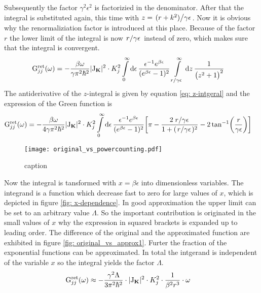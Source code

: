 Subsequently the factor $\gamma^{2} \epsilon^{2}$ is factorizied in the denominator.
After that the integral is substituted again, this time with $z = \flatfrac{(r + k^{2})}{\gamma\epsilon}$.
Now it is obvious why the renormaliziation factor is introduced at this place.
Because of the factor $r$ the lower limit of the integral is now $\flatfrac{r}{\gamma\epsilon}$ instead of zero, which makes sure that the integral is convergent.
%
\begin{align}
	\mt{G}_{jj}^{\mt{ret}}(\omega) &= 
		-\frac{\beta \omega}{\gamma \pi^{2} \hbar^{2}} 
		\vert \mt{J}_{\vb{K}} \vert^{2} \cdot K_{j}^{2}
		\int\limits_{0}^{\infty} \dd{\epsilon}
		\frac{\epsilon^{-1} e^{\beta \epsilon}}{(e^{\beta \epsilon} - 1)^{2}}
		\int\limits_{\flatfrac{r}{\gamma \epsilon}}^{\infty} \dd{z}
		\frac{1}{\big(z^{2} + 1\big)^{2}}
\end{align}
%
The antiderivative of the $z$-integral is given by equation \eqref{eq: z-intgeral} and the expression of the Green function is
%
\begin{align}
	\mt{G}_{jj}^{\mt{ret}}(\omega) &= 
		-\frac{\beta \omega}{4 \gamma \pi^{2} \hbar^{2}}
		\vert \mt{J}_{\vb{K}} \vert^{2} \cdot K_{j}^{2}
		\int\limits_{0}^{\infty} \dd{\epsilon}
		\frac{\epsilon^{-1} e^{\beta \epsilon}}{(e^{\beta \epsilon} - 1)^{2}}
		\bigg[\pi - \frac{2\flatfrac{r}{\gamma \epsilon}}{1+(\flatfrac{r}{\gamma \epsilon})^{2}} -2\tan[-1](\frac{r}{\gamma \epsilon})\bigg]
		\label{eq: Green function after evaluating momentum integral}
\end{align}
%
%
\begin{figure}[t]
	\centering
	\texttt{[image: original\_vs\_powercounting.pdf]}
	\caption{caption}
	\label{fig: original vs powercounting}
\end{figure}
%
Now the integral is tansformed with $x=\beta \epsilon$ into dimensionless variables.
The integrand is a function which decrease fast to zero for large values of $x$, which is depicted in figure \ref{fig: x-dependence}.
In good approximation the upper limit can be set to an arbitrary value $\Lambda$.
So the important contribution is originated in the small values of $x$ why the expression in squared brackets is expanded up to leading order.
The difference of the original and the approximated function are exhibited in figure \ref{fig: original_vs_approx1}.
Furter the fraction of the exponential functions can be approximated.
In total the intgerand is independent of the variable $x$ so the integral yields the factor $\Lambda$.
%
\begin{align}
	\mathrm{G}_{jj}^{\mathrm{ret}}(\omega) &\approx 
		-\frac{\gamma^{2} \Lambda}{3 \pi^{2} \hbar^{2}} \cdot
		\vert \mathrm{J}_{\vb{K}} \vert^{2} \cdot K_{j}^{2} \cdot
		\frac{1}{\beta^{2} r^{3}} \cdot
		\omega
\end{align}
